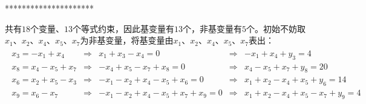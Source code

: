 \documentclass{ctexart}
\begin{document}
\begin{example}[用修正单纯形法求最大流问题] \label{exam: flow-simplex-modified}

    *********************

    共有$18$个变量、$13$个等式约束，因此基变量有$13$个，非基变量有$5$个。初始不妨取$x_1$、$x_2$、$x_4$、$x_5$、$x_7$为非基变量，将基变量由$x_1$、$x_2$、$x_4$、$x_5$、$x_7$表出：
    \begin{align*}
        \begin{array}{rclcl}
            x_3 = -x_1 + x_4      & \Rightarrow & x_1 + x_3 - x_4 = 0                    & \Rightarrow & -x_1 + x_4 + y_3 = 4                  \\
            x_8 = x_4 - x_5 + x_7 & \Rightarrow & -x_4 + x_5 - x_7 + x_8 = 0             & \Rightarrow & x_4 - x_5 + x_7 + y_8 = 20            \\
            x_6 = x_2 + x_5 - x_3 & \Rightarrow & -x_1 - x_2 + x_4 - x_5 + x_6 = 0       & \Rightarrow & x_1 + x_2 - x_4 + x_5 + y_6 = 14      \\
            x_9 = x_6 - x_7       & \Rightarrow & -x_1 - x_2 + x_4 - x_5 + x_7 + x_9 = 0 & \Rightarrow & x_1 + x_2 - x_4 + x_5 - x_7 + y_9 = 4 \\
        \end{array}
    \end{align*}



\end{example}
\end{document}
